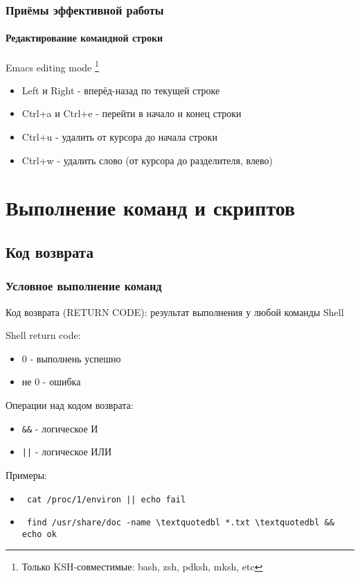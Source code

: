 \begin{frame}
  \frametitle{Приёмы эффективной работы}
  \framesubtitle{Редактирование командной строки}

  \Large{\alert{Emacs editing mode}} \footnote{Только KSH-совместимые: bash, zsh, pdksh, mksh, etc}

  \begin{itemize}
    \item \textquotedbl Left \textquotedbl и \textquotedbl Right \textquotedbl - вперёд-назад по текущей строке \pause
    \item \textquotedbl Ctrl+a \textquotedbl и \textquotedbl Ctrl+e \textquotedbl  - перейти в начало и конец строки \pause
    \item \textquotedbl Ctrl+u  \textquotedbl- удалить от курсора до начала строки \pause
    \item \textquotedbl Ctrl+w \textquotedbl- удалить слово (от курсора до разделителя, влево) 
  \end{itemize}
    
\end{frame}

\section{Выполнение команд и скриптов}

\subsection{Код возврата}

\begin{frame}[fragile]
  \frametitle{Условное выполнение команд}

  \Large{\alert{Код возврата (RETURN CODE)}}: \newline 
  \normalsize{результат выполнения у любой команды Shell}
  \newline

  Shell return code:
  \begin{itemize}
    \item 0 - выполнень успешно
    \item не 0 - ошибка
  \end{itemize}
  \pause

  Операции над кодом возврата:
  \begin{itemize}
    \item \textquotedbl \verb+&&+ \textquotedbl - логическое И
    \item \textquotedbl \verb+||+ \textquotedbl - логическое ИЛИ
  \end{itemize}
  \pause

  Примеры:
  \begin{itemize}
    \item \verb+ cat /proc/1/environ || echo fail +
    \item \verb+ find /usr/share/doc -name \textquotedbl *.txt \textquotedbl && echo ok+
  \end{itemize}

\end{frame}

